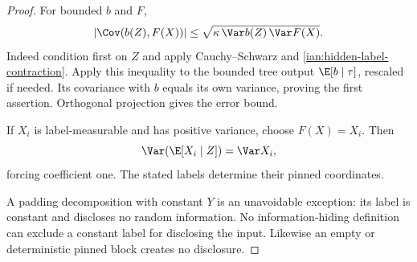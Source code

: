 \begin{proof}
For bounded \(b\) and \(F\),
\[
 |\Cov(b(Z),F(X))|
 \le\sqrt{\kappa\,\Var b(Z)\,\Var F(X)}.
\]
Indeed condition first on \(Z\) and apply Cauchy--Schwarz and
\eqref{ian:hidden-label-contraction}. Apply this inequality to the bounded tree output \(\E[b\mid\tau]\), rescaled if needed. Its covariance with \(b\) equals its own variance, proving the first assertion. Orthogonal projection gives the error bound.

If \(X_i\) is label-measurable and has positive variance, choose
\(F(X)=X_i\). Then
\[
 \Var(\E[X_i\mid Z])=\Var X_i,
\]
forcing coefficient one. The stated labels determine their pinned coordinates.

A padding decomposition with constant \(Y\) is an unavoidable exception: its label is constant and discloses no random information. No information-hiding definition can exclude a constant label for disclosing the input. Likewise an empty or deterministic pinned block creates no disclosure.
\end{proof}

